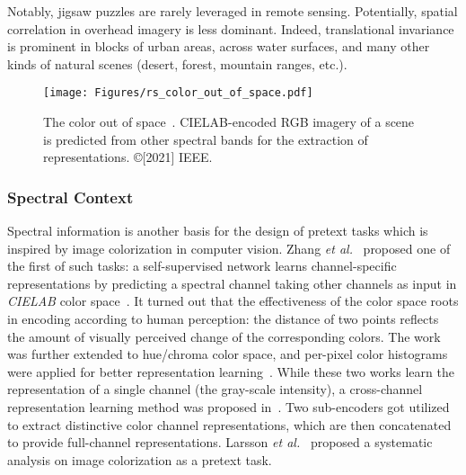 \documentclass[lettersize,journal]{IEEEtran}
\newcommand{\etal}{\textit{et al.}}
\begin{document}
Notably, jigsaw puzzles are rarely leveraged in remote sensing. Potentially, spatial correlation in overhead imagery is less dominant. Indeed, translational invariance is prominent in blocks of urban areas, across water surfaces, and many other kinds of natural scenes (desert, forest, mountain ranges, etc.).



\begin{figure*}
\centering
\texttt{[image: Figures/rs\_color\_out\_of\_space.pdf]}
\caption{The color out of space~\cite{vincenzi2021color}. CIELAB-encoded RGB imagery of a scene is predicted from other spectral bands for the extraction of representations. ©[2021] IEEE.}
\label{fig:color_out_of_space}
\end{figure*}


\subsubsection{Spectral Context}

Spectral information is another basis for the design of pretext tasks which is inspired by image colorization in computer vision. Zhang \etal~\cite{zhang2016colorful} proposed one of the first of such tasks: a self-supervised network learns channel-specific representations by predicting a spectral channel taking other channels as input in \textit{CIELAB} color space~\cite{hill1997comparative}. It turned out that the effectiveness of the color space roots in encoding according to human perception: the distance of two points reflects the amount of visually perceived change of the corresponding colors. The work was further extended to hue/chroma color space, and per-pixel color histograms were applied for better representation learning~\cite{larsson2016learning}. While these two works learn the representation of a single channel (the gray-scale intensity), a cross-channel representation learning method was proposed in~\cite{Zhang_2017_CVPR}. Two sub-encoders got utilized to extract distinctive color channel representations, which are then concatenated to provide full-channel representations. Larsson \etal~\cite{larsson2017colorization} proposed a systematic analysis on image colorization as a pretext task.
\end{document}
